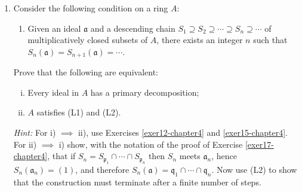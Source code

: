 \begin{enumerate}
    \textit{Hint:} Let $\mathfrak{a}$ be an ideal $\neq (1)$ in $A$, and let $\mathfrak{p}_1$ be a minimal element of the set of prime ideals containing $\mathfrak{a}$. Then $\mathfrak{q}_1 = S_{\mathfrak{p}_1}(\mathfrak{a})$ is $\mathfrak{p}_1$-primary (by Exercise \ref{exer11-chapter4}), and $\mathfrak{q}_1 = (\mathfrak{a} : x)$ for some $x \notin \mathfrak{p}_1$. Show that $\mathfrak{a} = \mathfrak{q}_1 \cap (\mathfrak{a} + (x))$. 
    
    \quad\, Now let $\mathfrak{a}_1$ be a maximal element of the set of ideals $\mathfrak{b} \supseteq \mathfrak{a}$ such that $\mathfrak{q}_1 \cap \mathfrak{b} = \mathfrak{a}$, and choose $\mathfrak{a}_1$ so that $x \in \mathfrak{a}_1$, and therefore $\mathfrak{a}_1 \not\subseteq \mathfrak{p}_1$. Repeat the construction starting with $\mathfrak{a}_1$, and so on. At the $n$th stage we have $\mathfrak{a} = \mathfrak{q}_1 \cap \cdots \cap \mathfrak{q}_n \cap \mathfrak{a}_n$ where the $\mathfrak{q}_i$ are primary ideals, $\mathfrak{a}_n$ is maximal among the ideals $\mathfrak{b}$ containing $\mathfrak{a}_{n-1} = \mathfrak{a}_n \cap \mathfrak{q}_n$ such that $\mathfrak{a} = \mathfrak{q}_1 \cap \cdots \cap \mathfrak{q}_n \cap \mathfrak{b}$, and $\mathfrak{a}_n \not\subseteq \mathfrak{p}_n$. If at any stage we have $\mathfrak{a}_n = (1)$, the process stops, and $\mathfrak{a}$ is a finite intersection of primary ideals. If not, continue by transfinite induction, observing that each $\mathfrak{a}_n$ strictly contains $\mathfrak{a}_{n-1}$.

    \item \label{exer18-chapter4}Consider the following condition on a ring $A$:
    \begin{enumerate}
        \item[(L2)] Given an ideal $\mathfrak{a}$ and a descending chain $S_1 \supseteq S_2 \supseteq \cdots \supseteq S_n \supseteq \cdots$ of multiplicatively closed subsets of $A$, there exists an integer $n$ such that $S_n(\mathfrak{a}) = S_{n+1}(\mathfrak{a}) = \cdots$.
    \end{enumerate}
    Prove that the following are equivalent:
    \begin{enumerate}[i)]
        \item Every ideal in $A$ has a primary decomposition;
        \item $A$ satisfies (L1) and (L2).
    \end{enumerate}
    \textit{Hint:} For i) $\implies$ ii), use Exercises \ref{exer12-chapter4} and \ref{exer15-chapter4}. For ii) $\implies$ i) show, with the notation of the proof of Exercise \ref{exer17-chapter4}, that if $S_n = S_{\mathfrak{p}_1} \cap \cdots \cap S_{\mathfrak{p}_n}$ then $S_n$ meets $\mathfrak{a}_n$, hence $S_n(\mathfrak{a}_n) = (1)$, and therefore $S_n(\mathfrak{a}) = \mathfrak{q}_1 \cap \cdots \cap \mathfrak{q}_n$. Now use (L2) to show that the construction must terminate after a finite number of steps.


\end{enumerate}
